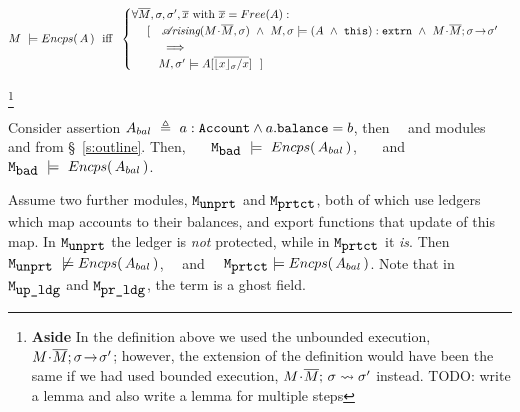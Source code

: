 \begin{definition} $~$ \\
\label{def:encapsulation}
$ %
    M\ \models \encaps{A}\ \   \mbox{iff}  \ \   
    \begin{cases}
     \forall \Mtwo, \sigma, \sigma', \overline{x} \mbox{ with } \overline{x}=Free(A):\\
   \ \ \ \  [\ \ \  \arising{M\madd\Mtwo}{\sigma}\ \wedge \  \satisfiesA{M}{\sigma}{(A \ \wedge\ \external {\prg{this})}}\  \wedge\  \leadstoOrig  {M\madd\Mtwo}  {\sigma}{\sigma'}\\
    \ \ \ \ \ \   \ \ \ \Longrightarrow\\
    \ \ \ \ \ \  \  {M},{\sigma'}\models{A[{\overline {{\interpret \sigma x}/x}}]} \ \  ]
    \end{cases}
 $%
  \end{definition}
 \footnote{\textbf{Aside} In the definition above we used the unbounded execution,  $M\!\cdot\!\overline{M};\sigma\! \rightarrow\! {\sigma'}$;  however, the extension of the definition would have been the same if we had used bounded execution, $M\!\cdot\!\overline{M};\, {\sigma} \rightsquigarrow \sigma'$ instead. TODO: write a lemma and also write a lemma for multiple steps}
 
\renewcommand{\ModD}{\ModParam{unprt}}
\newcommand{\ModE}{\ModParam{prtct}}
\begin{example}
Consider assertion $A_{bal}\  \triangleq\ a:\mbox{\normalfont{\texttt{Account}}}\wedge a.\mbox{\normalfont{\texttt{balance}}}=b$, then\ \ %
and modules \ModB and  \ModC  from \S~\ref{s:outline}. Then, \ \ \ $\mbox{\normalfont{\texttt{M}}}_{\mbox{\normalfont{\texttt{bad}}}}\ \models\ {Encps(\,  A_{bal} \, )}$, \ \ \ and \ \ \ $\mbox{\normalfont{\texttt{M}}}_{\mbox{\normalfont{\texttt{bad}}}}\ \models\ {Encps(\,  A_{bal} \, )}$.

Assume two further modules, $\ModD$ and $\ModE$, both of which  use ledgers which map  accounts to their balances, and export functions that update of this map. In  $\ModD$ the ledger is \emph{not} protected, while in $\ModE$ it \emph{is}. 
Then  \ \ $\ModD \ \not\models\encaps{ A_{bal}} $, \ \  and \ \ $\ModE  \models \encaps{ A_{bal}} $.
%
% 
\noindent
Note that in $\mbox{\normalfont{\texttt{M}}}_{\mbox{\normalfont{\texttt{up\_ldg}}}}$ and $\mbox{\normalfont{\texttt{M}}}_{\mbox{\normalfont{\texttt{pr\_ldg}}}}$, the term  is a ghost field. 
\end{example}

